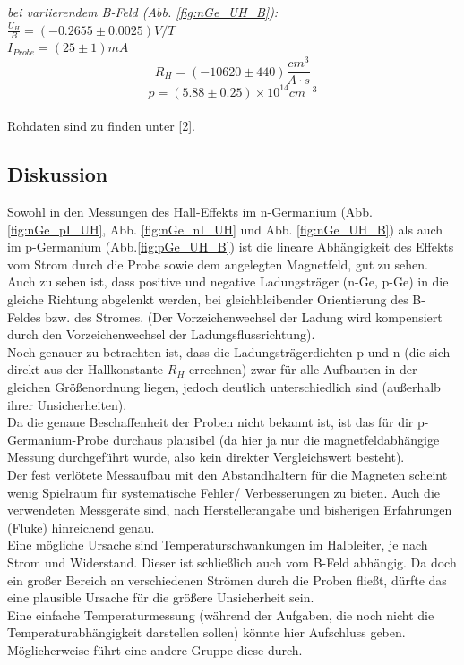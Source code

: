 \documentclass[12pt,a4paper]{article}
\begin{document}
\begin{multicols}{2}

\noindent \emph{bei variierendem B-Feld (Abb. \ref{fig:nGe_UH_B}):}\\

\noindent$\frac{U_H}{B}=(-0.2655 \pm 0.0025)V/T$\\
$I_{Probe}=(25 \pm 1)mA$\\
$$R_H=(-10620 \pm 440)\frac{cm^3}{A\cdot s}$$
$$p=(5.88\pm 0.25)\times 10^{14}cm^{-3}$$\\


Rohdaten sind zu finden unter [2].

\subsection{Diskussion}

Sowohl in den Messungen des Hall-Effekts im n-Germanium (Abb. \ref{fig:nGe_pI_UH}, Abb. \ref{fig:nGe_nI_UH} und Abb. \ref{fig:nGe_UH_B}) als auch im p-Germanium (Abb.\ref{fig:pGe_UH_B}) ist die lineare Abhängigkeit des Effekts vom Strom durch die Probe sowie dem angelegten Magnetfeld, gut zu sehen.\\
Auch zu sehen ist, dass positive und negative Ladungsträger (n-Ge, p-Ge) in die gleiche Richtung abgelenkt werden, bei gleichbleibender Orientierung des B-Feldes bzw. des Stromes. (Der Vorzeichenwechsel der Ladung wird kompensiert durch den Vorzeichenwechsel der Ladungsflussrichtung).\\

Noch genauer zu betrachten ist, dass die Ladungsträgerdichten p und n (die sich direkt aus der Hallkonstante $R_H$ errechnen) zwar für alle Aufbauten in der gleichen Größenordnung liegen, jedoch deutlich unterschiedlich sind (außerhalb ihrer Unsicherheiten).\\
Da die genaue Beschaffenheit der Proben nicht bekannt ist, ist das für dir p-Germanium-Probe durchaus plausibel (da hier ja nur die magnetfeldabhängige Messung durchgeführt wurde, also kein direkter Vergleichswert besteht).\\
Der fest verlötete Messaufbau mit den Abstandhaltern für die Magneten scheint wenig Spielraum für systematische Fehler/ Verbesserungen zu bieten. Auch die verwendeten Messgeräte sind, nach Herstellerangabe und bisherigen Erfahrungen (Fluke) hinreichend genau.\\
Eine mögliche Ursache sind Temperaturschwankungen im Halbleiter, je nach Strom und Widerstand. Dieser ist schließlich auch vom B-Feld abhängig. Da doch ein großer Bereich an verschiedenen Strömen durch die Proben fließt, dürfte das eine plausible Ursache für die größere Unsicherheit sein.\\
Eine einfache Temperaturmessung (während der Aufgaben, die noch nicht die Temperaturabhängigkeit darstellen sollen) könnte hier Aufschluss geben. Möglicherweise führt eine andere Gruppe diese durch.\\


\end{multicols}
\end{document}
